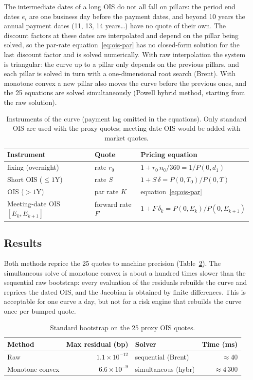 \documentclass[11pt,a4paper]{article}
\theoremstyle{plain}
\theoremstyle{definition}
\newcommand{\estr}{\text{\texteuro STR}}
\begin{document}
The intermediate dates of a long OIS do not all fall on pillars: the period end dates $e_i$ are one business day before the payment dates, and beyond 10 years the annual payment dates (11, 13, 14 years\dots) have no quote of their own. The discount factors at these dates are interpolated and depend on the pillar being solved, so the par-rate equation~\eqref{eq:ois-par} has no closed-form solution for the last discount factor and is solved numerically. With raw interpolation the system is triangular: the curve up to a pillar only depends on the previous pillars, and each pillar is solved in turn with a one-dimensional root search (Brent). With monotone convex a new pillar also moves the curve before the previous ones, and the 25 equations are solved simultaneously (Powell hybrid method, starting from the raw solution).

\begin{table}[htbp]
\centering
\begin{tabular}{@{}lll@{}}
\toprule
Instrument & Quote & Pricing equation \\
\midrule
\estr{} fixing (overnight) & rate $r_0$ & $1+r_0\,n_0/360=1/P(0,d_1)$ \\
Short OIS ($\le1$Y) & rate $S$ & $1+S\,\delta=P(0,T_0)/P(0,T)$ \\
OIS ($>1$Y) & par rate $K$ & equation~\eqref{eq:ois-par} \\
Meeting-date OIS $[E_k,E_{k+1}]$ & forward rate $F$ & $1+F\,\delta_k=P(0,E_k)/P(0,E_{k+1})$ \\
\bottomrule
\end{tabular}
\caption{Instruments of the \estr{} curve (payment lag omitted in the equations). Only standard OIS are used with the proxy quotes; meeting-date OIS would be added with market quotes.}
\label{tab:instruments}
\end{table}

\subsection{Results}
Both methods reprice the 25 quotes to machine precision (Table~\ref{tab:report}). The simultaneous solve of monotone convex is about a hundred times slower than the sequential raw bootstrap: every evaluation of the residuals rebuilds the curve and reprices the dated OIS, and the Jacobian is obtained by finite differences. This is acceptable for one curve a day, but not for a risk engine that rebuilds the curve once per bumped quote.

\begin{table}[htbp]
\centering
\small
\begin{tabular}{@{}lrlr@{}}
\toprule
Method & Max residual (bp) & Solver & Time (ms) \\
\midrule
Raw & $1.1\times10^{-12}$ & sequential (Brent) & $\approx40$ \\
Monotone convex & $6.6\times10^{-9}$ & simultaneous (hybr) & $\approx4\,300$ \\
\bottomrule
\end{tabular}
\caption{Standard bootstrap on the 25 proxy OIS quotes.}
\label{tab:report}
\end{table}
\end{document}
